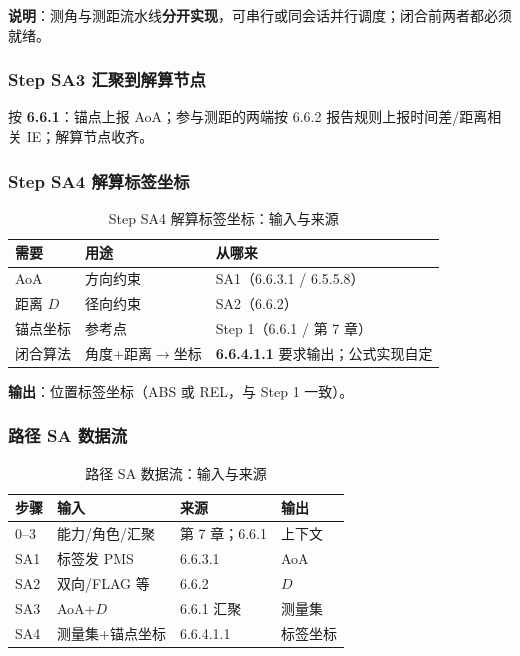 \documentclass[11pt,a4paper]{ctexart}
\begin{document}
\textbf{说明}：测角与测距流水线\textbf{分开实现}，可串行或同会话并行调度；闭合前两者都必须就绪。

\subsubsection{Step SA3 汇聚到解算节点}

按 \textbf{6.6.1}：锚点上报 AoA；参与测距的两端按 6.6.2 报告规则上报时间差/距离相关 IE；解算节点收齐。

\subsubsection{Step SA4 解算标签坐标}

\begin{longtable}{L{3.4cm}L{4.8cm}L{4.8cm}}
\caption{Step SA4 解算标签坐标：输入与来源\label{tab:step125}} \\
\toprule
\textbf{需要} & \textbf{用途} & \textbf{从哪来} \\
\midrule
AoA & 方向约束 & SA1（6.6.3.1 / 6.5.5.8） \\
距离 $D$ & 径向约束 & SA2（6.6.2） \\
锚点坐标 & 参考点 & Step 1（6.6.1 / 第 7 章） \\
闭合算法 & 角度+距离$\rightarrow$坐标 & \textbf{6.6.4.1.1} 要求输出；公式实现自定 \\
\bottomrule
\end{longtable}

\textbf{输出}：位置标签坐标（ABS 或 REL，与 Step 1 一致）。

\subsubsection{路径 SA 数据流}

\begin{longtable}{llll}
\caption{路径 SA 数据流：输入与来源\label{tab:step126}} \\
\toprule
\textbf{步骤} & \textbf{输入} & \textbf{来源} & \textbf{输出} \\
\midrule
0--3 & 能力/角色/汇聚 & 第 7 章；6.6.1 & 上下文 \\
SA1 & 标签发 PMS & 6.6.3.1 & AoA \\
SA2 & 双向/FLAG 等 & 6.6.2 & $D$ \\
SA3 & AoA+$D$ & 6.6.1 汇聚 & 测量集 \\
SA4 & 测量集+锚点坐标 & 6.6.4.1.1 & 标签坐标 \\
\bottomrule
\end{longtable}
\end{document}

